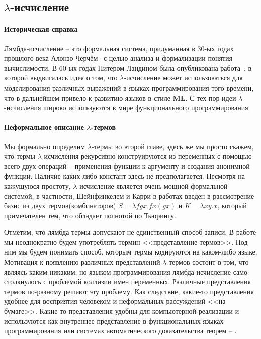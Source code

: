 \subsection{\texorpdfstring{$\lambda$}{Лямбда}-исчисление}
\label{sec:lambda}

\paragraph{Историческая справка}
Лямбда-исчисление -- это формальная система, придуманная в 30-ых годах прошлого века Алонзо Черчём~\cite{church1936unsolvable} с целью анализа и формализации понятия вычислимости. В 60-ых годах Питером Ландином была опубликована работа~\cite{landin1964mechanical}, в которой выдвигалась идея о том, что $\lambda$-исчисление может использоваться для моделирования различных выражений в языках программирования того времени, что в дальнейшем привело к развитию языков в стиле \textbf{ML}. С тех пор идеи $\lambda$-исчисления широко используются в мире функционального программирования.

\paragraph{Неформальное описание $\lambda$-термов}
Мы формально определим $\lambda$-термы во второй главе, здесь же мы просто скажем, что термы $\lambda$-исчисления рекурсивно конструируются из переменных с помощью всего двух операций -- применения функции к аргументу и создания анонимной функции. Наличие каких-либо констант здесь не предполагается. Несмотря на кажущуюся простоту, $\lambda$-исчисление является очень мощной формальной системой, в частности, Шейнфинкелем и Карри в работах \cite{schonfinkel1924bausteine, curry1930grundlagen} введен в рассмотрение базис из двух термов(комбинаторов) $S = \lambda f g x. f x (g x)$ и $K = \lambda x y. x$, который примечателен тем, что обладает полнотой по Тьюрингу.

Отметим, что лямбда-термы допускают не единственный способ записи. В работе мы неоднократно будем употреблять термин <<представление термов>>. Под ним мы будем понимать способ, которым термы кодируются на каком-либо языке. Мотивация к появлению различных представлений $\lambda$-термов состоит в том, что являясь каким-никаким, но языком программирования лямбда-исчисление само столкнулось с проблемой коллизии имен переменных. Различные представления термов по-разному решают эту проблему. Как следствие, какие-то представления удобнее для восприятия человеком и неформальных рассуждений <<на бумаге>>. Какие-то представления удобны для компьютерной реализации и используются как внутреннее представление в функциональных языках программирования или системах автоматического доказательства теорем -- \cite{norell2007towards}.

